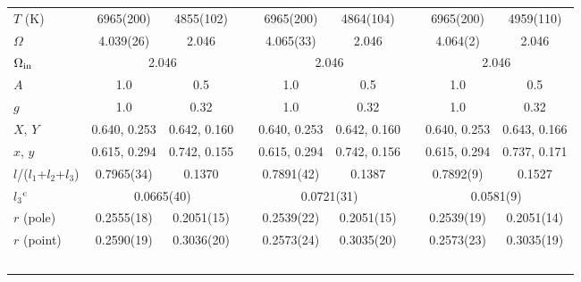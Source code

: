 \documentclass[useAMS,usenatbib,usegraphicx]{mn2e}
\begin{document}
\begin{table}
\begin{tabular}{lcccccccc}
$T$ (K)                                  & 6965(200)         & 4855(102)                    && 6965(200)         & 4864(104)                    && 6965(200)         & 4959(110)                      \\
$\Omega$                                 & 4.039(26)         & 2.046                        && 4.065(33)         & 2.046                        && 4.064(2)          & 2.046                          \\
$\Omega_{\rm in}$                        & \multicolumn{2}{c}{2.046}                        && \multicolumn{2}{c}{2.046}                        && \multicolumn{2}{c}{2.046}                          \\
$A$                                      & 1.0               & 0.5                          && 1.0               & 0.5                          && 1.0               & 0.5                            \\
$g$                                      & 1.0               & 0.32                         && 1.0               & 0.32                         && 1.0               & 0.32                           \\
$X$, $Y$                                 & 0.640, 0.253      & 0.642, 0.160                 && 0.640, 0.253      & 0.642, 0.160                 && 0.640, 0.253      & 0.643, 0.166                   \\
$x$, $y$                                 & 0.615, 0.294      & 0.742, 0.155                 && 0.615, 0.294      & 0.742, 0.156                 && 0.615, 0.294      & 0.737, 0.171                   \\
$l$/($l_{1}$+$l_{2}$+$l_{3}$)            & 0.7965(34)        & 0.1370                       && 0.7891(42)        & 0.1387                       && 0.7892(9)         & 0.1527                         \\
$l_{3}$$\rm ^c$                          & \multicolumn{2}{c}{0.0665(40)}                   && \multicolumn{2}{c}{0.0721(31)}                   && \multicolumn{2}{c}{0.0581(9)}                      \\
$r$ (pole)                               & 0.2555(18)        & 0.2051(15)                   && 0.2539(22)        & 0.2051(15)                   && 0.2539(19)        & 0.2051(14)                     \\
$r$ (point)                              & 0.2590(19)        & 0.3036(20)                   && 0.2573(24)        & 0.3035(20)                   && 0.2573(23)        & 0.3035(19)                     \\
$$
\end{tabular}
\end{table}
\end{document}
